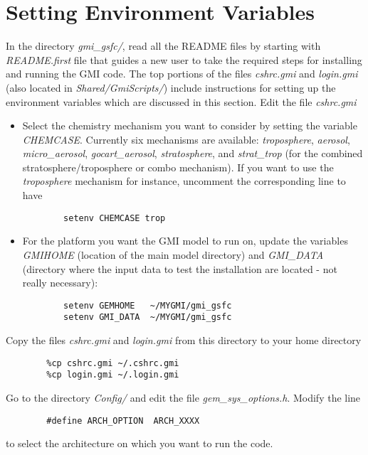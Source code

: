 \section{Setting Environment Variables} \label{sec:envi}
%
In the directory {\em gmi\_gsfc/}, read all the README files by 
starting with {\em README.first} 
file that guides a new user to take the required steps for 
installing and running the GMI code. 
The top portions of the files {\em cshrc.gmi} and {\em login.gmi}
(also located in {\em Shared/GmiScripts/})
include instructions for setting up the environment variables
which are discussed in this section.
\newline
\newline
%
Edit the file {\em cshrc.gmi} 
\begin{itemize}
\item Select the chemistry mechanism you want to consider by setting
      the variable {\em CHEMCASE}. Currently six mechanisms are
      available: {\em troposphere}, {\em aerosol}, {\em micro\_aerosol},
      {\em gocart\_aerosol}, {\em stratosphere}, and
      {\em strat\_trop} (for the combined stratosphere/troposphere or combo mechanism).
      If you want to use the {\em troposphere}  mechanism for instance, uncomment
      the corresponding line to have
\begin{verbatim}
        setenv CHEMCASE trop
\end{verbatim}
%
\item For the platform you want the GMI model to run on,
      update the variables {\em GMIHOME} (location of the main 
      model directory) and {\em GMI\_DATA} (directory where the input 
      data to test the installation are located - not really necessary):
%
\begin{verbatim}
        setenv GEMHOME   ~/MYGMI/gmi_gsfc
        setenv GMI_DATA  ~/MYGMI/gmi_gsfc
\end{verbatim}
\end{itemize}
%
%
Copy the files {\em cshrc.gmi} and {\em login.gmi}  from this directory to your home 
directory
%
\begin{verbatim}
        %cp cshrc.gmi ~/.cshrc.gmi
        %cp login.gmi ~/.login.gmi
\end{verbatim}
%
Go to the directory {\em Config/} and edit the file {\em gem\_sys\_options.h}. 
Modify the line
%
\begin{verbatim}
        #define ARCH_OPTION  ARCH_XXXX
\end{verbatim}
%
to select the architecture on which you want to run the code.
